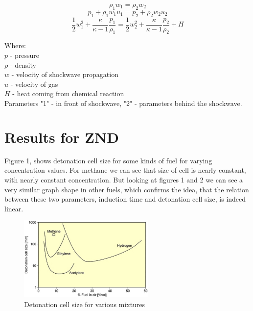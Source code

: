 \documentclass[11pt,a4paper]{article}
\begin{document}
\begin{equation}
    \rho_1 w_1 = \rho_2 w_2
\end{equation}
\begin{equation}
    p_1 + \rho_1 w_1 u_1 =p_2 + \rho_2 w_2 u_2
\end{equation}
\begin{equation}
    \frac{1}{2} w_1^2 + \frac{\kappa}{\kappa - 1} \frac{p_1}{\rho_1} = \frac{1}{2} w_2^2 + \frac{\kappa}{\kappa - 1} \frac{p_2}{\rho_2} + H
\end{equation}

Where:\\
$p$ - pressure\\
$\rho$ - density\\
$w$ - velocity of shockwave propagation\\
$u$ - velocity of gas\\
$H$ - heat coming from chemical reaction\\
Parameters "1" - in front of shockwave, "2" - parameters behind the shockwave.\\

\section{Results for ZND}\label{sec:results}
Figure 1, shows detonation cell size for some kinds of fuel for varying concentration values. For methane we can see that size of cell is nearly constant, with nearly constant concentration. But looking at figures 1 and 2 we can see a very similar graph shape in other fuels, which confirms the idea, that the relation between these two parameters, induction time and detonation cell size, is indeed linear.\\

\begin{figure}[h]
    \centering
    \includegraphics[width=0.6\textwidth]{komorkadetonacji}
    \caption{Detonation cell size for various mixtures}
    \label{fig:A}
\end{figure}
\end{document}
